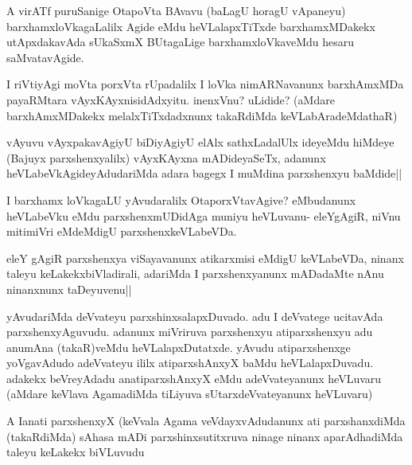 \begin{artha}
A virATf puruSanige OtapoVta BAvavu (baLagU horagU vApaneyu) barxhamxloVkagaLalilx Agide eMdu heVLalapxTiTxde barxhamxMDakekx utApxdakavAda sUkaSxmX BUtagaLige barxhamxloVkaveMdu hesaru saMvatavAgide.
\end{artha}

\begin{artha}
I riVtiyAgi moVta porxVta rUpadalilx I loVka nimARNavanunx barxhAmxMDa payaRMtara vAyxKAyxnisidAdxyitu. inenxVnu? uLidide? (aMdare barxhAmxMDakekx melalxTiTxdadxnunx takaRdiMda keVLabAradeMdathaR)
\end{artha}


\begin{artha}
vAyuvu vAyxpakavAgiyU biDiyAgiyU elAlx sathxLadalUlx ideyeMdu hiMdeye (Bajuyx parxshenxyalilx) vAyxKAyxna mADideyaSeTx, adanunx heVLabeVkAgideyAdudariMda adara bagegx I muMdina parxshenxyu baMdide||
\end{artha}

\begin{artha}
I barxhamx loVkagaLU yAvudaralilx OtaporxVtavAgive? eMbudanunx heVLabeVku eMdu parxshenxmUDidAga muniyu heVLuvanu- eleYgAgiR, niVnu mitimiVri eMdeMdigU parxshenxkeVLabeVDa.
\end{artha}


\begin{artha}
eleY gAgiR parxshenxya viSayavanunx atikarxmisi eMdigU keVLabeVDa, ninanx taleyu keLakekxbiVladirali, adariMda I parxshenxyanunx mADadaMte nAnu ninanxnunx taDeyuvenu||
\end{artha}


\begin{artha}
yAvudariMda deVvateyu parxshinxsalapxDuvado. adu I deVvatege ucitavAda parxshenxyAguvudu. adanunx miVriruva parxshenxyu atiparxshenxyu adu anumAna (takaR)veMdu heVLalapxDutatxde. yAvudu atiparxshenxge yoVgavAdudo adeVvateyu ililx atiparxshAnxyX baMdu heVLalapxDuvadu. adakekx beVreyAdadu anatiparxshAnxyX eMdu adeVvateyanunx heVLuvaru (aMdare keVlava AgamadiMda tiLiyuva sUtarxdeVvateyanunx heVLuvaru)
\end{artha}%

\begin{artha}
A Ianati parxshenxyX (keVvala Agama veVdayxvAdudanunx ati parxshanxdiMda (takaRdiMda) sAhasa mADi parxshinxsutitxruva ninage ninanx aparAdhadiMda taleyu keLakekx biVLuvudu 
\end{artha}

